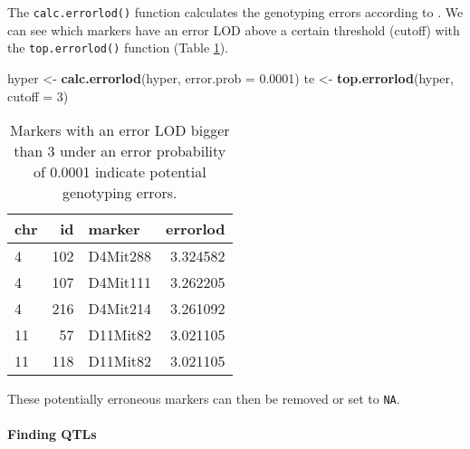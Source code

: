 \documentclass[12pt,]{krantz}
\newenvironment{Shaded}{\begin{snugshade}}{\end{snugshade}}
\newcommand{\KeywordTok}[1]{\textcolor[rgb]{0.27,0.27,0.27}{\textbf{{#1}}}}
\newcommand{\DataTypeTok}[1]{\textcolor[rgb]{0.27,0.27,0.27}{{#1}}}
\newcommand{\DecValTok}[1]{\textcolor[rgb]{0.06,0.06,0.06}{{#1}}}
\newcommand{\FloatTok}[1]{\textcolor[rgb]{0.06,0.06,0.06}{{#1}}}
\newcommand{\StringTok}[1]{\textcolor[rgb]{0.5,0.5,0.5}{{#1}}}
\newcommand{\OtherTok}[1]{\textcolor[rgb]{0.37,0.37,0.37}{{#1}}}
\newcommand{\NormalTok}[1]{{#1}}
\let\oldparagraph\paragraph
\renewcommand{\paragraph}[1]{\oldparagraph{#1}\mbox{}}
\theoremstyle{definition}
\theoremstyle{definition}
\theoremstyle{remark}
\begin{document}
The \texttt{calc.errorlod()} function calculates the genotyping errors
according to \citet{Lincoln1992604}. We can see which markers have an
error LOD above a certain threshold (cutoff) with the
\texttt{top.errorlod()} function (Table \ref{tab:qtl-te}).

\begin{Shaded}
\begin{Highlighting}[]
\NormalTok{hyper <-}\StringTok{ }\KeywordTok{calc.errorlod}\NormalTok{(hyper, }\DataTypeTok{error.prob =} \FloatTok{0.0001}\NormalTok{)}
\NormalTok{te <-}\StringTok{ }\KeywordTok{top.errorlod}\NormalTok{(hyper, }\DataTypeTok{cutoff =} \DecValTok{3}\NormalTok{)}
\end{Highlighting}
\end{Shaded}

\begin{table}

\caption{\label{tab:qtl-te}Markers with an error LOD bigger than 3 under an error probability of 0.0001 indicate potential genotyping errors.}
\centering
\begin{tabular}[t]{lrlr}
\toprule
chr & id & marker & errorlod\\
\midrule
4 & 102 & D4Mit288 & 3.324582\\
4 & 107 & D4Mit111 & 3.262205\\
4 & 216 & D4Mit214 & 3.261092\\
11 & 57 & D11Mit82 & 3.021105\\
11 & 118 & D11Mit82 & 3.021105\\
\bottomrule
\end{tabular}
\end{table}

These potentially erroneous markers can then be removed or set to
\texttt{NA}.

\begin{Shaded}
\end{Shaded}

\paragraph{Finding QTLs}\label{finding-qtls}
\end{document}
